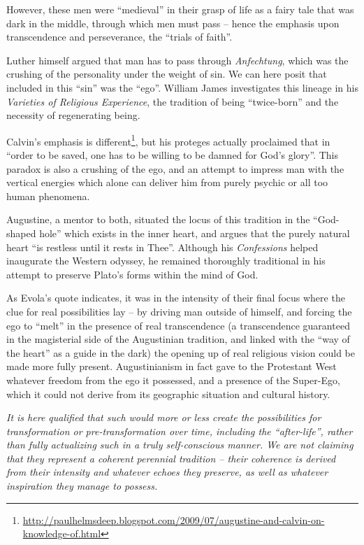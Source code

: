 However, these men were ``medieval'' in their grasp of life as a fairy tale that was dark in the middle, through which men must pass -- hence the emphasis upon transcendence and perseverance, the ``trials of faith''.

Luther himself argued that man has to pass through \emph{Anfechtung}, which was the crushing of the personality under the weight of sin. We can here posit that included in this ``sin'' was the ``ego''. William James investigates this lineage in his \emph{Varieties of Religious Experience}, the tradition of being ``twice-born'' and the necessity of regenerating being.

Calvin's emphasis is different\footnote{\url{http://paulhelmsdeep.blogspot.com/2009/07/augustine-and-calvin-on-knowledge-of.html}}, but his proteges actually proclaimed that in ``order to be saved, one has to be willing to be damned for God's glory''. This paradox is also a crushing of the ego, and an attempt to impress man with the vertical energies which alone can deliver him from purely psychic or all too human phenomena.

Augustine, a mentor to both, situated the locus of this tradition in the ``God-shaped hole'' which exists in the inner heart, and argues that the purely natural heart ``is restless until it rests in Thee''. Although his \emph{Confessions} helped inaugurate the Western odyssey, he remained thoroughly traditional in his attempt to preserve Plato's forms within the mind of God.

As Evola's quote indicates, it was in the intensity of their final focus where the clue for real possibilities lay -- by driving man outside of himself, and forcing the ego to ``melt'' in the presence of real transcendence (a transcendence guaranteed in the magisterial side of the Augustinian tradition, and linked with the ``way of the heart'' as a guide in the dark) the opening up of real religious vision could be made more fully present. Augustinianism in fact gave to the Protestant West whatever freedom from the ego it possessed, and a presence of the Super-Ego, which it could not derive from its geographic situation and cultural history.

\emph{It is here qualified that such would more or less create the possibilities for transformation or pre-transformation over time, including the ``after-life'', rather than fully actualizing such in a truly self-conscious manner. We are not claiming that they represent a coherent perennial tradition -- their coherence is derived from their intensity and whatever echoes they preserve, as well as whatever inspiration they manage to possess.}

